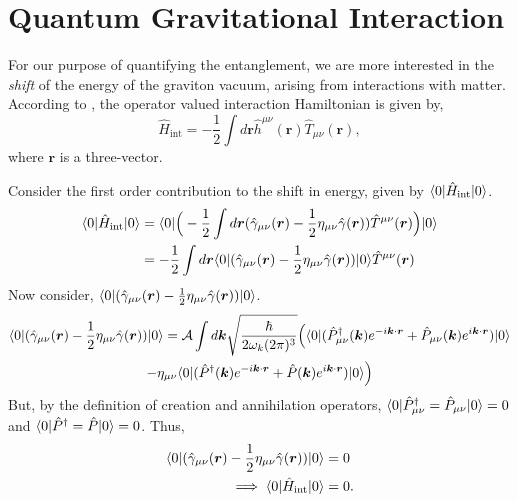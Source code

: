\documentclass[12pt,a4paper]{report}
\theoremstyle{plain}
\theoremstyle{definition}
\theoremstyle{remark}
\newcommand{\mink}{\eta_{\mu\nu}}
\newcommand{\munu}{\mu\nu}
\newcommand{\Hint}{\hat{H}_{\text{int}}}
\DeclarePairedDelimiter\bra{\langle}{\rvert}
\DeclarePairedDelimiter\ket{\lvert}{\rangle}
\begin{document}
\section{Quantum Gravitational Interaction}
For our purpose of quantifying the entanglement, we are more interested in the \textit{shift} of the energy of the graviton vacuum, arising from interactions with matter. According to \citet{weinberg}, the operator valued interaction Hamiltonian is given by,
\begin{equation}
    \hat{H}_{\text{int}} = -\frac{1}{2}\int d\bm{r} \hat{h}^{\munu}(\bm{r})\hat{T}_{\munu}(\bm{r}),
    \label{eq: InteractionHamiltonian}
\end{equation}
where $\bm{r}$ is a three-vector.

Consider the first order contribution to the shift in energy, given by $\bra{0}\Hint\ket{0}$.
\begin{equation}
    \begin{aligned}
        \bra{0}\Hint\ket{0} &= \bra{0}\Big(-\frac{1}{2}\int d\bm{r} (\hat{\gamma}_{\munu}(\bm{r}) - \frac{1}{2}\mink\hat{\gamma}(\bm{r}))\hat{T}^{\munu}(\bm{r})\Big)\ket{0} \\
        &= -\frac{1}{2}\int d\bm{r} \bra{0}(\hat{\gamma}_{\munu}(\bm{r}) - \frac{1}{2}\mink\hat{\gamma}(\bm{r}))\ket{0}\hat{T}^{\munu}(\bm{r})
    \end{aligned}
\end{equation}
Now consider, $\bra{0}(\hat{\gamma}_{\munu}(\bm{r}) - \frac{1}{2}\mink\hat{\gamma}(\bm{r}))\ket{0}$.
\begin{multline}
     \bra{0}(\hat{\gamma}_{\munu}(\bm{r}) - \frac{1}{2}\mink\hat{\gamma}(\bm{r}))\ket{0} = \mathcal{A} \int d{\bm{k}} \sqrt{\frac{\hbar}{2\omega_k(2\pi)^3}} \Big(\bra{0}(\hat{P}_{\munu}^{\dagger}(\bm{k})e^{-i\bm{k}\cdot\bm{r}} + \hat{P}_{\munu}(\bm{k})e^{i\bm{k}\cdot\bm{r}})\ket{0}\\ -  \mink \bra{0}(\hat{P}^{\dagger}(\bm{k})e^{-i\bm{k}\cdot\bm{r}} + \hat{P}(\bm{k})e^{i\bm{k}\cdot\bm{r}})\ket{0}\Big)
\end{multline}
But, by the definition of creation and annihilation operators, $\bra{0}\hat{P}^{\dagger}_{\munu} = \hat{P}_{\munu}\ket{0} =  0$ and $\bra{0}\hat{P}^{\dagger} = \hat{P}\ket{0} =  0$. Thus,
\begin{equation}
    \begin{aligned}
        \bra{0}(\hat{\gamma}_{\munu}(\bm{r}) - \frac{1}{2}\mink\hat{\gamma}(\bm{r}))\ket{0} &= 0 \\
        \implies \bra{0}\Hint\ket{0} &= 0.
    \end{aligned}
\end{equation}
\end{document}
